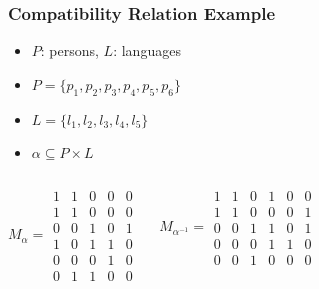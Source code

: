 \documentclass[dvipsnames]{beamer}
\begin{document}
\begin{frame}
  \frametitle{Compatibility Relation Example}

  \begin{itemize}
   \item $P$: persons, $L$: languages
   \item $P=\{p_1,p_2,p_3,p_4,p_5,p_6\}$
   \item $L=\{l_1,l_2,l_3,l_4,l_5\}$
   \item $\alpha \subseteq P \times L$
  \end{itemize}

  \pause
  \begin{columns}
    \[
      M_\alpha =
        \begin{array}{|ccccc|}
          1  &  1  &  0  &  0  &  0\\
          1  &  1  &  0  &  0  &  0\\
          0  &  0  &  1  &  0  &  1\\
          1  &  0  &  1  &  1  &  0\\
          0  &  0  &  0  &  1  &  0\\
          0  &  1  &  1  &  0  &  0
        \end{array}
    \]

    \[
      M_{\alpha^{-1}} =
        \begin{array}{|cccccc|}
          1  &  1  &  0  &  1  &  0  &  0\\
          1  &  1  &  0  &  0  &  0  &  1\\
          0  &  0  &  1  &  1  &  0  &  1\\
          0  &  0  &  0  &  1  &  1  &  0\\
          0  &  0  &  1  &  0  &  0  &  0
        \end{array}
    \]
  \end{columns}
\end{frame}
\end{document}

